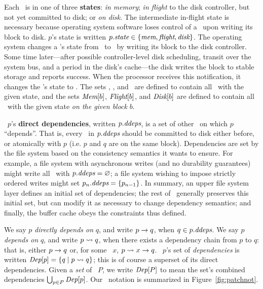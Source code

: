 Each \patch\ is in one of three \textbf{states}: \emph{in memory}; \emph{in
 flight} to the disk controller, but not yet committed to disk; or
 \emph{on disk}.  The intermediate in-flight state is necessary because
 operating system software loses control of a \patch\ upon writing its block
 to disk.  $p$'s state is written $p.\textit{state} \in \{\textit{mem}, \textit{flight},
 \textit{disk}\}$.  The operating system changes a \patch's state from
 \PMemst\ to \PInfst\ by writing its block to the disk controller.  Some
 time later---after possible controller-level disk scheduling, transit over
 the system bus, and a period in the disk's cache---the disk writes the block
 to stable storage and reports success.  When the processor receives this
 notification, it changes the \patch's state to \PDiskst.
%
The sets \PMem, \PInf, and \PDisk\ are defined to contain all \patches\ with
 the given state, and the sets $\PMem[b]$, $\PInf[b]$, and $\PDisk[b]$ are
 defined to contain all \patches\ with the given state \emph{on the given
 block} $b$.

\Patch\ $p$'s \textbf{direct dependencies}, written $\PDDepset{p}$, is a set of
 other \patches\ on which $p$ ``depends''.
%
That is, every \patch\ in $\PDDepset{p}$ should be committed to disk either
 before, or atomically with $p$ (i.e. $p$ and $q$ are on the same block).
%
Dependencies are set by the file system based on the consistency
 semantics it wants to ensure.
%
For example, a file system with asynchronous writes (and no durability
 guarantees) might write all \patches\ with $\PDDepset{p} = \emptyset$;
%
a file system wishing to impose strictly ordered writes might set
 $\PDDepset{p_n} = \{p_{n-1}\}$.
%
In summary, an upper file system layer defines an initial set of
 dependencies;
%
the rest of \Kudos\ generally preserves this initial set, but can modify
 it as necessary to change dependency semantics;
%
and finally, the buffer cache obeys the constraints thus defined.


We say $p$ \emph{directly depends on} $q$, and write $p \rightarrow q$, when
 $q \in \PDDepset{p}$.
%
We say $p$ \emph{depends on} $q$, and write $p \leadsto q$, when there
 exists a dependency chain from $p$ to $q$: that is, either $p \rightarrow q$
 or, for some \patch\ $x$, $p \leadsto x \rightarrow q$.
%
\Patch\ $p$'s set of \emph{dependencies} is written $\textit{Dep}[p] = \{ q \mid
 p \leadsto q \}$; this is of course a superset of its direct dependencies.
%
Given a \emph{set} of \patches\ $P$, we write $\textit{Dep}[P]$ to mean the set's
 combined dependencies $\bigcup_{p\in P} \textit{Dep}[p]$. Our \patch\ notation
 is summarized in Figure~\ref{fig:patchnot}.

